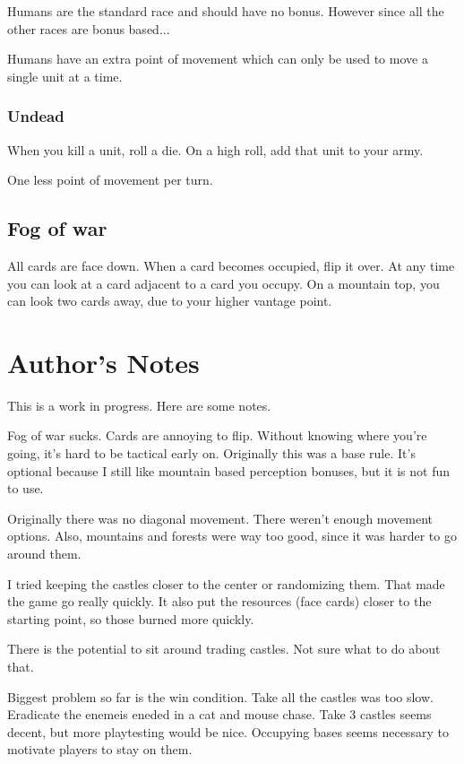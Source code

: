 \documentclass{article}
\begin{document}
Humans are the standard race and should have no bonus.  However since all the other races are bonus based...

Humans have an extra point of movement which can only be used to move a single unit at a time.  

\subsubsection{Undead}

When you kill a unit, roll a die.  On a high roll, add that unit to your army.  

One less point of movement per turn.

\subsection{Fog of war}

All cards are face down.  When a card becomes occupied, flip it over.   At any time you can look at a card adjacent to a card you occupy.  On a mountain top, you can look two cards away, due to your higher vantage point.

\newpage
\section{Author's Notes}

This is a work in progress.  Here are some notes.

Fog of war sucks.  Cards are annoying to flip.  Without knowing where you're going, it's hard to be tactical early on.  Originally this was a base rule.  It's optional because I still like mountain based perception bonuses, but it is not fun to use.

Originally there was no diagonal movement.  There weren't enough movement options.  Also, mountains and forests were way too good, since it was harder to go around them.

I tried keeping the castles closer to the center or randomizing them.  That made the game go really quickly.  It also put the resources (face cards) closer to the starting point, so those burned more quickly.

There is the potential to sit around trading castles.  Not sure what to do about that.

Biggest problem so far is the win condition.  Take all the castles was too slow.  Eradicate the enemeis eneded in a cat and mouse chase.  Take 3 castles seems decent, but more playtesting would be nice.  Occupying bases seems necessary to motivate players to stay on them.
\end{document}
